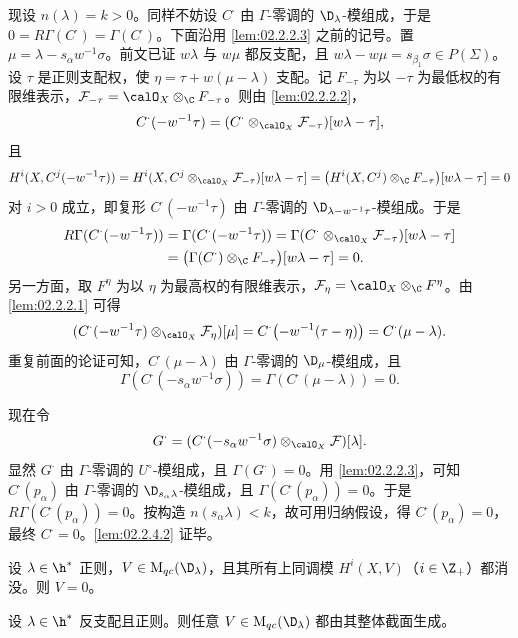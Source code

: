现设 $n(\lambda)=k>0$。同样不妨设 $C^\cdot$ 由 $\Gamma$-零调的 $\D_\lambda$-模组成，于是 $0=R\Gamma(C^\cdot)=\Gamma(C^\cdot)$。下面沿用 \ref{lem:02.2.2.3} 之前的记号。置 $\mu=\lambda-s_\alpha w^{-1}\sigma$。前文已证 $w\lambda$ 与 $w\mu$ 都反支配，且 $w\lambda-w\mu=s_{\beta_1}\sigma\in P(\Sigma)$。设 $\tau$ 是正则支配权，使 $\eta=\tau+w(\mu-\lambda)$ 支配。记 $F_{-\tau}$ 为以 $-\tau$ 为最低权的有限维表示，$\mathcal{F}_{-\tau}=\calO_X\otimes_\C F_{-\tau}$。则由 \ref{lem:02.2.2.2}，
\[
C^\cdot(-w^{-1}\tau)=(C^\cdot\otimes_{\calO_X}\mathcal{F}_{-\tau})[w\lambda-\tau],
\]
且
\[
H^i(X,C^j(-w^{-1}\tau))=H^i(X,C^j\otimes_{\calO_X}\mathcal{F}_{-\tau})[w\lambda-\tau]
=\bigl(H^i(X,C^j)\otimes_\C F_{-\tau}\bigr)[w\lambda-\tau]=0
\]
对 $i>0$ 成立，即复形 $C^\cdot(-w^{-1}\tau)$ 由 $\Gamma$-零调的 $\D_{\lambda-w^{-1}\tau}$-模组成。于是
\begin{align*}
R\Gamma(C^\cdot(-w^{-1}\tau))&=\Gamma(C^\cdot(-w^{-1}\tau))
=\Gamma(C^\cdot\otimes_{\calO_X}\mathcal{F}_{-\tau})[w\lambda-\tau]\\
&=\bigl(\Gamma(C^\cdot)\otimes_\C F_{-\tau}\bigr)[w\lambda-\tau]=0 .
\end{align*}
另一方面，取 $F^\eta$ 为以 $\eta$ 为最高权的有限维表示，$\mathcal{F}_\eta=\calO_X\otimes_\C F^\eta$。由 \ref{lem:02.2.2.1} 可得
\[
(C^\cdot(-w^{-1}\tau)\otimes_{\calO_X}\mathcal{F}_\eta)[\mu]=C^\cdot\bigl(-w^{-1}(\tau-\eta)\bigr)=C^\cdot(\mu-\lambda).
\]
重复前面的论证可知，$C^\cdot(\mu-\lambda)$ 由 $\Gamma$-零调的 $\D_\mu$-模组成，且
\[
\Gamma(C^\cdot(-s_\alpha w^{-1}\sigma))=\Gamma(C^\cdot(\mu-\lambda))=0 .
\]

现在令
\[
G^\cdot=(C^\cdot(-s_\alpha w^{-1}\sigma)\otimes_{\calO_X}\mathcal{F})[\lambda].
\]
显然 $G^\cdot$ 由 $\Gamma$-零调的 $U^\circ$-模组成，且 $\Gamma(G^\cdot)=0$。用 \ref{lem:02.2.2.3}，可知 $C^\cdot(p_\alpha)$ 由 $\Gamma$-零调的 $\D_{s_\alpha\lambda}$-模组成，且 $\Gamma(C^\cdot(p_\alpha))=0$。于是 $R\Gamma(C^\cdot(p_\alpha))=0$。按构造 $n(s_\alpha\lambda)<k$，故可用归纳假设，得 $C^\cdot(p_\alpha)=0$，最终 $C^\cdot=0$。\ref{lem:02.2.4.2} 证毕。

\begin{corollary}\label{cor:02.2.4.3}
设 $\lambda\in\h^*$ 正则，$V\in \mathrm{M}_{qc}(\D_\lambda)$，且其所有上同调模 $H^i(X,V)$（$i\in\Z_+$）都消没。则 $V=0$。
\end{corollary}

\begin{corollary}\label{cor:02.2.4.4}
设 $\lambda\in\h^*$ 反支配且正则。则任意 $V\in \mathrm{M}_{qc}(\D_\lambda)$ 都由其整体截面生成。
\end{corollary}


